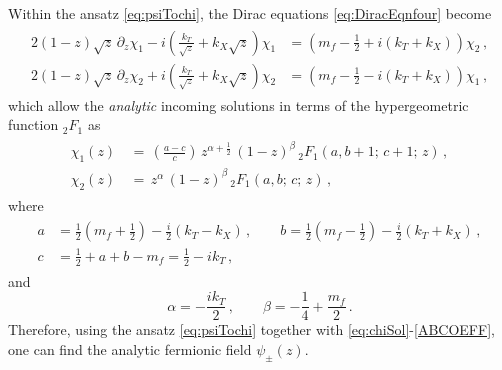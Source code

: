 \documentclass[11pt,a4paper]{article}
\newcommand\CW[1]{\textcolor{red}{\bf [CW:\,#1]}}
\begin{document}
Within the ansatz \eqref{eq:psiTochi}, the Dirac equations \eqref{eq:DiracEqnfour} become
\begin{align}\label{eq:Dirac Eqn chi12 a}
\begin{split}
    2(1-z)\sqrt{z} \, \partial_z \chi_1 - i\left( \frac{k_T}{\sqrt{z}} + k_X \sqrt{z} \right) \chi_1 &= \left( m_f-\frac{1}{2}+i(k_T+k_X) \right)\chi_2\,, \\
    2(1-z)\sqrt{z} \, \partial_z \chi_2 + i\left( \frac{k_T}{\sqrt{z}} + k_X \sqrt{z} \right) \chi_2 &= \left( m_f-\frac{1}{2}-i(k_T+k_X) \right)\chi_1\,,
\end{split}
\end{align}
which allow the \textit{analytic} incoming solutions in terms of the hypergeometric function ${}_2 F_{1}$ as
\begin{align}\label{eq:chiSol}
\begin{split}
    \chi_1(z) &\,=\, \left( \frac{a-c}{c} \right) \, z^{\alpha+\frac{1}{2}} \, (1-z)^\beta \, {}_2 F_{1}(a,b+1;\,c+1;\,z) \,, \\
    \chi_2(z) &\,=\,  z^\alpha \, (1-z)^\beta \, {}_2 F_{1}(a,b;\,c;\,z)\,,
\end{split}
\end{align}
where
\begin{align}\label{abcre}
\begin{split}
a &= \frac{1}{2} \left( m_f+\frac{1}{2} \right) - \frac{i}{2} \left(k_T -  k_X\right)\,, \qquad 
b = \frac{1}{2} \left( m_f-\frac{1}{2} \right) - \frac{i}{2} \left( k_T + k_X \right)\,,\\
c &= \frac{1}{2}+a+b-m_f  = \frac{1}{2} - i k_T  \,,
\end{split}
\end{align}
and
\begin{equation}\label{ABCOEFF}
    \alpha = - \frac{i k_T}{2}\,, \qquad \beta = - \frac{1}{4} + \frac{m_f}{2}\,.
\end{equation}
Therefore, using the ansatz \eqref{eq:psiTochi} together with \eqref{eq:chiSol}-\eqref{ABCOEFF}, one can find the analytic fermionic field $\psi_\pm(z)$.
%
\end{document}
